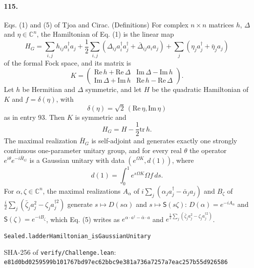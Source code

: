 \documentclass[11pt]{article}
\begin{document}
\paragraph{115.} Eqs. (1) and (5) of Tjoa and Cirac. (Definitions) For complex $n \times n$ matrices $h$, $\Delta$ and $\eta \in \mathbb C^n$, the Hamiltonian of Eq. (1) is the linear map \[H_G = \sum_{i,j} h_{ij} a_i^\dagger a_j + \frac12 \sum_{i,j} (\Delta_{ij} a_i^\dagger a_j^\dagger + \bar\Delta_{ij} a_i a_j) + \sum_j (\eta_j a_j^\dagger + \bar\eta_j a_j)\] of the formal Fock space, and its matrix is \[K = \begin{pmatrix} \mathrm{Re}\, h + \mathrm{Re}\, \Delta & \mathrm{Im}\, \Delta - \mathrm{Im}\, h \\ \mathrm{Im}\, \Delta + \mathrm{Im}\, h & \mathrm{Re}\, h - \mathrm{Re}\, \Delta \end{pmatrix}.\] Let $h$ be Hermitian and $\Delta$ symmetric, and let $H$ be the quadratic Hamiltonian of $K$ and $f = \delta(\eta)$, with \[\delta(\eta) = \sqrt2\, (\mathrm{Re}\, \eta, \mathrm{Im}\, \eta)\] as in entry 93. Then $K$ is symmetric and \[H_G = H - \frac12 \mathrm{tr}\, h.\] The maximal realization $\bar H_G$ is self-adjoint and generates exactly one strongly continuous one-parameter unitary group, and for every real $\theta$ the operator $e^{i\theta} e^{-i\bar H_G}$ is a Gaussian unitary with data $(e^{\Omega K}, d(1))$, where \[d(1) = \int_0^1 e^{s\Omega K}\Omega f\, ds.\] For $\alpha, \zeta \in \mathbb C^n$, the maximal realizations $A_\alpha$ of $i \sum_j (\alpha_j a_j^\dagger - \bar\alpha_j a_j)$ and $B_\zeta$ of $\frac i2 \sum_j (\bar\zeta_j a_j^2 - \zeta_j a_j^{\dagger 2})$ generate $s \mapsto D(s\alpha)$ and $s \mapsto \mathsf S(s\zeta)$: $D(\alpha) = e^{-iA_\alpha}$ and $\mathsf S(\zeta) = e^{-iB_\zeta}$, which Eq. (5) writes as $e^{\alpha \cdot a^\dagger - \bar\alpha \cdot a}$ and $e^{\frac12 \sum_j (\bar\zeta_j a_j^2 - \zeta_j a_j^{\dagger 2})}$.\par{\footnotesize\texttt{Sealed.ladderHamiltonian\_isGaussianUnitary}}

\vfill{\footnotesize SHA-256 of \texttt{verify/Challenge.lean}: \texttt{e81d0bd0259599b101767bd97ec62bbc9e381a736a7257a7eac257b55d926586}}
\end{document}
